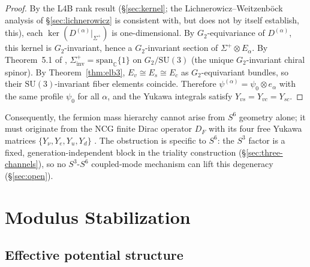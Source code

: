 \documentclass[12pt,a4paper]{article}
\begin{document}
\begin{proof}
  By the L4B rank result (\S\ref{sec:kernel}; the Lichnerowicz--Weitzenb\"ock analysis of
  \S\ref{sec:lichnerowicz} is consistent with, but does not by itself establish, this),
  each $\ker(D^{(\alpha)}|_{\Sigma^+})$
  is one-dimensional. By $G_2$-equivariance of $D^{(\alpha)}$, this kernel is $G_2$-invariant,
  hence a $G_2$-invariant section of $\Sigma^+\otimes E_\alpha$.
  By Theorem~5.1 of \cite{AgrHofLawn2023}, $\Sigma^+_{\mathrm{inv}} = \mathrm{span}_{\mathbb{C}}\{1\}$
  on $G_2/\mathrm{SU}(3)$ (the unique $G_2$-invariant chiral spinor).
  By Theorem~\ref{thm:elb3}, $E_v\cong E_s\cong E_c$
  as $G_2$-equivariant bundles, so their $\mathrm{SU}(3)$-invariant fiber elements coincide.
  Therefore $\psi^{(\alpha)} = \psi_0\otimes e_\alpha$ with the same profile $\psi_0$ for all $\alpha$,
  and the Yukawa integrals satisfy $Y_{vs} = Y_{vc} = Y_{sc}$.
\end{proof}

Consequently, the fermion mass hierarchy cannot arise from $S^6$ geometry alone; it must
originate from the NCG finite Dirac operator $D_F$ with its four free Yukawa matrices
$\{Y_\nu, Y_e, Y_u, Y_d\}$ \cite{CCM2006}. The obstruction is specific to $S^6$: the $S^3$ factor is a fixed, generation-independent
block in the triality construction (\S\ref{sec:three-channels}), so no $S^3$-$S^6$
coupled-mode mechanism can lift this degeneracy (\S\ref{sec:open}).

\section{Modulus Stabilization}
\label{sec:moduli}

\subsection{Effective potential structure}
\end{document}
